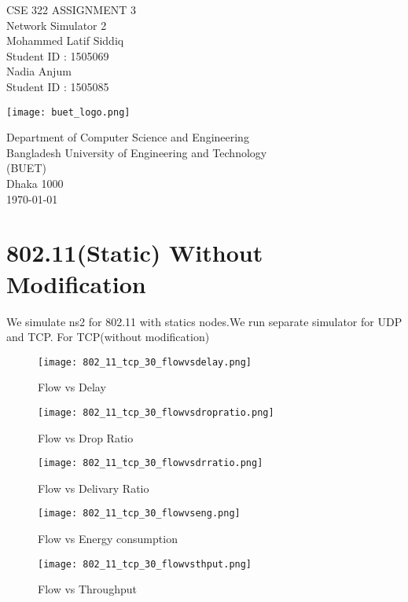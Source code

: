 \documentclass{report}
\begin{document}
\begin{titlepage}
    \begin{center}
        \vspace*{1cm}
        
        \Large
         CSE 322 ASSIGNMENT 3\\
         Network Simulator 2  \\
         
        \normalsize
        \vspace{1.5cm}
        Mohammed Latif Siddiq\\
        Student ID : 1505069\\
        Nadia Anjum\\
        Student ID : 1505085
        
        \vfill
        
        \vspace{0.8cm}
        
        \texttt{[image: buet\_logo.png]}
        
        \Large
        Department of Computer Science and Engineering\\
       Bangladesh University of Engineering and Technology\\
      (BUET)\\
      Dhaka 1000\\
       \today
        
    \end{center}
\end{titlepage}

\newpage

\tableofcontents
\chapter{802.11(Static) Without Modification}
We simulate ns2 for 802.11 with statics nodes.We run separate simulator for UDP and TCP.
For TCP(without modification)
\begin{figure}
  \caption{Flow vs Delay}
  \centering
    \texttt{[image: 802\_11\_tcp\_30\_flowvsdelay.png]}
\end{figure}
\begin{figure}
  \caption{Flow vs Drop Ratio}
  \centering
    \texttt{[image: 802\_11\_tcp\_30\_flowvsdropratio.png]}
\end{figure}
\begin{figure}
  \caption{Flow vs Delivary Ratio}
  \centering
    \texttt{[image: 802\_11\_tcp\_30\_flowvsdrratio.png]}
\end{figure}
\begin{figure}
  \caption{Flow vs Energy consumption}
  \centering
    \texttt{[image: 802\_11\_tcp\_30\_flowvseng.png]}
\end{figure}
\begin{figure}
  \caption{Flow vs Throughput}
  \centering
    \texttt{[image: 802\_11\_tcp\_30\_flowvsthput.png]}
\end{figure}
\end{document}
